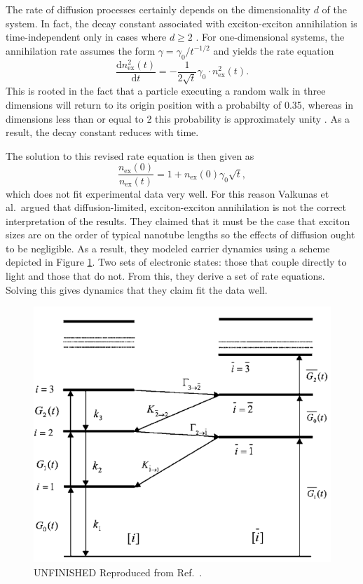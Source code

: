The rate of diffusion processes certainly depends on the dimensionality $d$ of the system. In fact, the decay constant associated with exciton-exciton annihilation is time-independent only in cases where $d \geq 2$ \cite{valkunas2006exciton}. For one-dimensional systems, the annihilation rate assumes the form $\gamma = \gamma_0 / t^{-1/2}$ and yields the rate equation
\begin{equation}
		\frac{\mathrm{d} n_\text{ex}^2(t)}{\mathrm{d}t} = -\frac{1}{2 \sqrt{t}}  \gamma_0 \cdot n_\text{ex}^2(t).
		\label{eq:exc_1d_annih}
\end{equation}
 This is rooted in the fact that a particle executing a random walk in three dimensions will return to its origin position with a probabilty of 0.35, whereas in dimensions less than or equal to 2 this probability is approximately unity \cite{suna1970kinematics}. As a result, the decay constant reduces with time.

The solution to this revised rate equation is then given as
\begin{equation}
	\frac{n_\text{ex}(0)}{n_\text{ex}(t)} = 1 + n_\text{ex}(0) \gamma_0 \sqrt{t},
\end{equation}
which does not fit experimental data very well. For this reason Valkunas et al.\ argued that diffusion-limited, exciton-exciton annihilation is not the correct interpretation of the results. They claimed that it must be the case that exciton sizes are on the order of typical nanotube lengths so the effects of diffusion ought to be negligible. As a result, they modeled carrier dynamics using a scheme depicted in Figure \ref{fig:exciton_manif_valkunas}. Two sets of electronic states: those that couple directly to light and those that do not. From this, they derive a set of rate equations. Solving this gives dynamics that they claim fit the data well.


\begin{figure}[ht]
	\centering
	\includegraphics[scale=0.5]{images/chapter_prior_works/exciton_manifold_valkunas_2006}
	\caption{ {\color{red} UNFINISHED} Reproduced from Ref.\ \cite{valkunas2006exciton}. }
	\label{fig:exciton_manif_valkunas}
\end{figure}

